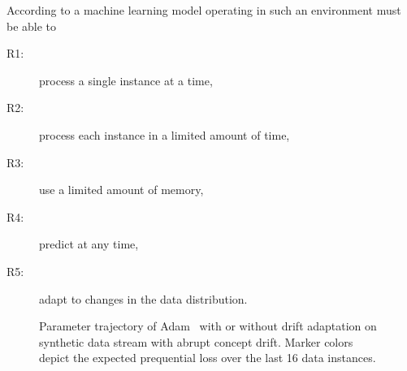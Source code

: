\documentclass[letterpaper]{article} %
\begin{document}
According to \citet{bifetMOAMassiveOnline2010} a machine learning model operating in such an environment must be able to
\begin{center}
	\begin{varwidth}{0.5\textwidth}
		\begin{description}
			\item[R1:] process a single instance at a time,\label{rq:single_instance}
			\item[R2:] process each instance in a limited amount of time,\label{rq:limited_time}
			\item[R3:] use a limited amount of memory,\label{rq:limited_memory}
			\item[R4:] predict at any time,\label{rq:predict_any_time}
			\item[R5:] adapt to changes in the data distribution.\label{rq:adapt_to_drift}
		\end{description}
	\end{varwidth}
\end{center}

\begin{figure}[ht]
	\centering
	\caption{Parameter trajectory of Adam~\cite{kingmaAdamMethodStochastic2017b} with or without drift adaptation on synthetic data stream with abrupt concept drift. Marker colors depict the expected prequential loss over the last 16 data instances.}
	\label{fig:adam_reset}
\end{figure}
\end{document}
